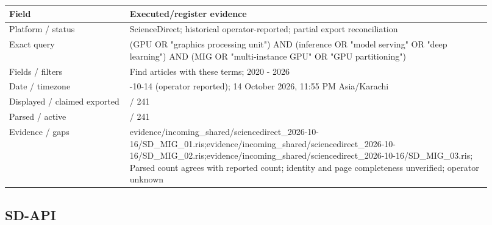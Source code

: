 \documentclass[12pt,a4paper]{article}
\begin{document}
{\small\begin{longtable}{>{\raggedright\arraybackslash}p{0.23\linewidth}>{\raggedright\arraybackslash}p{0.69\linewidth}}
\toprule
Field & Executed/\allowbreak{}register evidence\\\midrule
\endhead
Platform /\allowbreak{} status & ScienceDirect; historical operator-reported; partial export reconciliation\\
Exact query & (GPU OR "graphics processing unit") AND (inference OR "model serving" OR "deep learning") AND (MIG OR "multi-instance GPU" OR "GPU partitioning")\\
Fields /\allowbreak{} filters & Find articles with these terms; 2020 - 2026\\
Date /\allowbreak{} timezone & 2026-10-14 (operator reported); 14 October 2026, 11:\allowbreak{}55 PM Asia/\allowbreak{}Karachi\\
Displayed /\allowbreak{} claimed exported & 241 /\allowbreak{} 241\\
Parsed /\allowbreak{} active & 241 /\allowbreak{} 241\\
Evidence /\allowbreak{} gaps & evidence/\allowbreak{}incoming\_\allowbreak{}shared/\allowbreak{}sciencedirect\_\allowbreak{}2026-10-16/\allowbreak{}SD\_\allowbreak{}MIG\_\allowbreak{}01.ris;evidence/\allowbreak{}incoming\_\allowbreak{}shared/\allowbreak{}sciencedirect\_\allowbreak{}2026-10-16/\allowbreak{}SD\_\allowbreak{}MIG\_\allowbreak{}02.ris;evidence/\allowbreak{}incoming\_\allowbreak{}shared/\allowbreak{}sciencedirect\_\allowbreak{}2026-10-16/\allowbreak{}SD\_\allowbreak{}MIG\_\allowbreak{}03.ris; Parsed count agrees with reported count; identity and page completeness unverified; operator unknown\\
\bottomrule
\end{longtable}}

\subsection*{SD-API}
\end{document}
